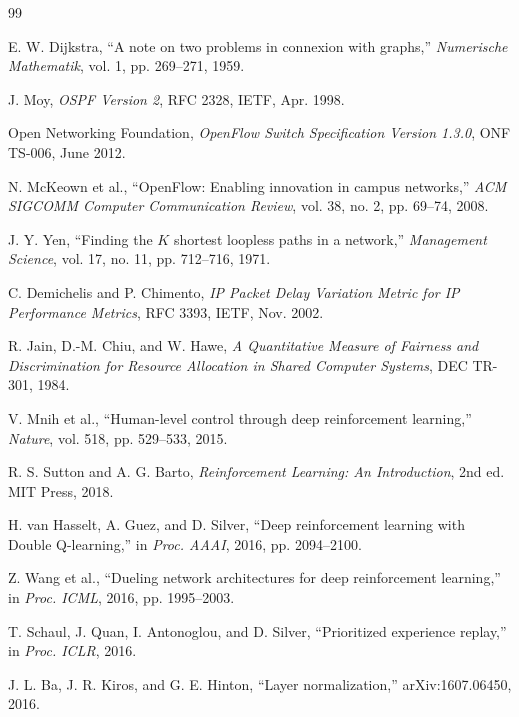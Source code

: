 \documentclass[12pt,a4paper,oneside]{report}
\begin{document}
\begin{thebibliography}{99}

E. W. Dijkstra, ``A note on two problems in connexion with graphs,'' \emph{Numerische Mathematik}, vol. 1, pp. 269--271, 1959.

J. Moy, \emph{OSPF Version 2}, RFC 2328, IETF, Apr. 1998.

Open Networking Foundation, \emph{OpenFlow Switch Specification Version 1.3.0}, ONF TS-006, June 2012.

N. McKeown et al., ``OpenFlow: Enabling innovation in campus networks,'' \emph{ACM SIGCOMM Computer Communication Review}, vol. 38, no. 2, pp. 69--74, 2008.

J. Y. Yen, ``Finding the $K$ shortest loopless paths in a network,'' \emph{Management Science}, vol. 17, no. 11, pp. 712--716, 1971.

C. Demichelis and P. Chimento, \emph{IP Packet Delay Variation Metric for IP Performance Metrics}, RFC 3393, IETF, Nov. 2002.

R. Jain, D.-M. Chiu, and W. Hawe, \emph{A Quantitative Measure of Fairness and Discrimination for Resource Allocation in Shared Computer Systems}, DEC TR-301, 1984.

V. Mnih et al., ``Human-level control through deep reinforcement learning,'' \emph{Nature}, vol. 518, pp. 529--533, 2015.

R. S. Sutton and A. G. Barto, \emph{Reinforcement Learning: An Introduction}, 2nd ed. MIT Press, 2018.

H. van Hasselt, A. Guez, and D. Silver, ``Deep reinforcement learning with Double Q-learning,'' in \emph{Proc. AAAI}, 2016, pp. 2094--2100.

Z. Wang et al., ``Dueling network architectures for deep reinforcement learning,'' in \emph{Proc. ICML}, 2016, pp. 1995--2003.

T. Schaul, J. Quan, I. Antonoglou, and D. Silver, ``Prioritized experience replay,'' in \emph{Proc. ICLR}, 2016.

J. L. Ba, J. R. Kiros, and G. E. Hinton, ``Layer normalization,'' arXiv:1607.06450, 2016.


\end{thebibliography}
\end{document}

